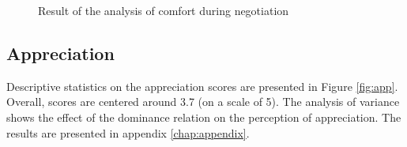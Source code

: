 \documentclass[10pt, a4paper]{article} %
\begin{document}
	\begin{figure}[h]
	
	
	\caption{Result of the analysis of comfort during negotiation}
	\label{tab:confort}
\end{figure}

	\subsection{Appreciation}
		Descriptive statistics on the appreciation scores are presented in Figure \ref{fig:app}. Overall, scores are centered around 3.7 (on a scale of 5). The analysis of variance shows the effect of the dominance relation on the perception of appreciation. The results are presented in appendix \ref{chap:appendix}.
		
\end{document}
